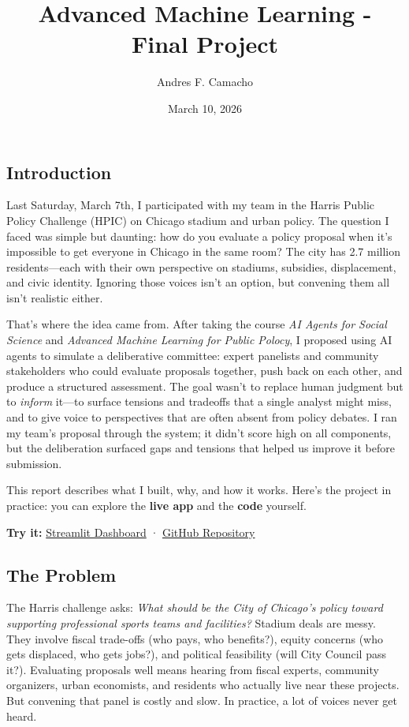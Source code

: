 \documentclass[
  11pt,
]{article}
\title{Advanced Machine Learning - Final Project}
\author{Andres F. Camacho}
\date{March 10, 2026}
\begin{document}
\maketitle

\subsection{Introduction}\label{introduction}

Last Saturday, March 7th, I participated with my team in the Harris
Public Policy Challenge (HPIC) on Chicago stadium and urban policy. The
question I faced was simple but daunting: how do you evaluate a policy
proposal when it's impossible to get everyone in Chicago in the same
room? The city has 2.7 million residents---each with their own
perspective on stadiums, subsidies, displacement, and civic identity.
Ignoring those voices isn't an option, but convening them all isn't
realistic either.

That's where the idea came from. After taking the course \emph{AI Agents
for Social Science} and \emph{Advanced Machine Learning for Public
Polocy}, I proposed using AI agents to simulate a deliberative
committee: expert panelists and community stakeholders who could
evaluate proposals together, push back on each other, and produce a
structured assessment. The goal wasn't to replace human judgment but to
\emph{inform} it---to surface tensions and tradeoffs that a single
analyst might miss, and to give voice to perspectives that are often
absent from policy debates. I ran my team's proposal through the system;
it didn't score high on all components, but the deliberation surfaced
gaps and tensions that helped us improve it before submission.

This report describes what I built, why, and how it works. Here's the
project in practice: you can explore the \textbf{live app} and the
\textbf{code} yourself.

\textbf{Try it:}
\href{https://ai-augmetnted-deliberative-committee-hpic.streamlit.app}{Streamlit
Dashboard} ·
\href{https://github.com/anfelipecb/AI-Augmetnted-Deliberative-Committee}{GitHub
Repository}

\subsection{The Problem}\label{the-problem}

The Harris challenge asks: \emph{What should be the City of Chicago's
policy toward supporting professional sports teams and facilities?}
Stadium deals are messy. They involve fiscal trade-offs (who pays, who
benefits?), equity concerns (who gets displaced, who gets jobs?), and
political feasibility (will City Council pass it?). Evaluating proposals
well means hearing from fiscal experts, community organizers, urban
economists, and residents who actually live near these projects. But
convening that panel is costly and slow. In practice, a lot of voices
never get heard.
\end{document}
